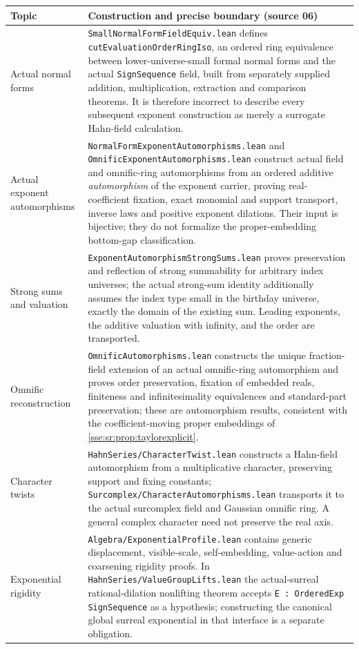 \documentclass[11pt,a4paper]{article}
\numberwithin{equation}{section}
\theoremstyle{plain}
\theoremstyle{definition}
\theoremstyle{remark}
\newcommand{\code}[1]{\texttt{\small #1}}
\begin{document}
\begingroup\small
\begin{longtable}{P{34mm}P{114mm}}
\toprule
Topic & Construction and precise boundary (source 06) \\
\midrule
\endhead
\bottomrule
\endfoot
Actual normal forms &
\code{SmallNormalFormFieldEquiv.lean} defines \code{cutEvaluationOrderRingIso},
an ordered ring equivalence between lower-universe-small formal normal forms
and the actual \code{SignSequence} field, built from separately supplied
addition, multiplication, extraction and comparison theorems. It is therefore
incorrect to describe every subsequent exponent construction as merely a
surrogate Hahn-field calculation. \\[3pt]
Actual exponent automorphisms &
\code{NormalFormExponentAutomorphisms.lean} and
\code{OmnificExponentAutomorphisms.lean} construct actual field and omnific-ring
automorphisms from an ordered additive \emph{automorphism} of the exponent
carrier, proving real-coefficient fixation, exact monomial and support
transport, inverse laws and positive exponent dilations. Their input is
bijective; they do not formalize the proper-embedding bottom-gap
classification. \\[3pt]
Strong sums and valuation &
\code{ExponentAutomorphismStrongSums.lean} proves preservation and reflection
of strong summability for arbitrary index universes; the actual strong-sum
identity additionally assumes the index type small in the birthday universe,
exactly the domain of the existing sum. Leading exponents, the additive
valuation with infinity, and the order are transported. \\[3pt]
Omnific reconstruction &
\code{OmnificAutomorphisms.lean} constructs the unique fraction-field extension
of an actual omnific-ring automorphism and proves order preservation, fixation
of embedded reals, finiteness and infinitesimality equivalences and
standard-part preservation; these are automorphism results, consistent with the
coefficient-moving proper embeddings of \cref{sse:sr:prop:taylorexplicit}. \\[3pt]
Character twists &
\code{HahnSeries/CharacterTwist.lean} constructs a Hahn-field automorphism from
a multiplicative character, preserving support and fixing constants;
\code{Surcomplex/CharacterAutomorphisms.lean} transports it to the actual
surcomplex field and Gaussian omnific ring. A general complex character need not
preserve the real axis. \\[3pt]
Exponential rigidity &
\code{Algebra/ExponentialProfile.lean} contains generic displacement,
visible-scale, self-embedding, value-action and coarsening rigidity proofs. In
\code{HahnSeries/ValueGroupLifts.lean} the actual-surreal rational-dilation
nonlifting theorem accepts \code{E : OrderedExp SignSequence} as a hypothesis;
constructing the canonical global surreal exponential in that interface is a
separate obligation. \\
\end{longtable}
\endgroup
\end{document}
